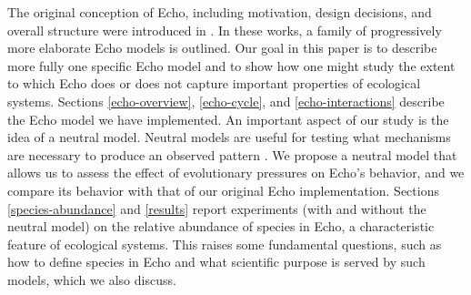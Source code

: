 
The original conception of Echo, including motivation, design
decisions, and overall structure were introduced in
\cite{Holland92,Holland94,Holland95a}.  In these works, a family of
progressively more elaborate Echo models is outlined.  Our goal in
this paper is to describe more fully one specific Echo model and to
show how one might study the extent to which Echo does or does not
capture important properties of ecological systems.  
Sections \ref{echo-overview}, \ref{echo-cycle}, and \ref{echo-interactions} 
describe the Echo model we have implemented.  An important aspect of
our study is the idea of a neutral model.  
Neutral models are useful for testing what mechanisms are necessary to
produce an observed pattern \cite{NiteckiAndHoffman87}.  We propose a 
neutral model that allows us to assess the effect of evolutionary pressures on
Echo's behavior, and we compare its behavior with that of our original
Echo implementation.  Sections \ref{species-abundance} and
\ref{results} report experiments (with and without the neutral model)
on the relative abundance of species in Echo, a characteristic feature
of ecological systems.  This raises some fundamental questions, such
as how to define species in Echo and what scientific purpose is served
by such models, which we also discuss.
